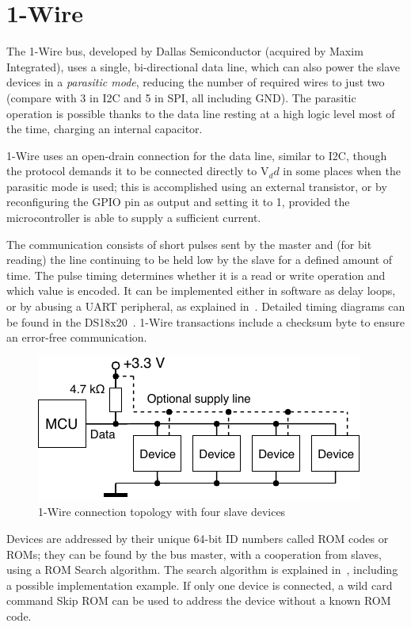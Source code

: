 \section{1-Wire} \label{sec:theory-1wire}

The 1-Wire bus, developed by Dallas Semiconductor (acquired by Maxim Integrated), uses a single, bi-directional data line, which can also power the slave devices in a \textit{parasitic mode}, reducing the number of required wires to just two (compare with 3 in \gls{I2C} and 5 in \gls{SPI}, all including \gls{GND}). The parasitic operation is possible thanks to the data line resting at a high logic level most of the time, charging an internal capacitor.

1-Wire uses an open-drain connection for the data line, similar to \gls{I2C}, though the protocol demands it to be connected directly to V$_dd$ in some places when the parasitic mode is used; this is accomplished using an external transistor, or by reconfiguring the GPIO pin as output and setting it to 1, provided the microcontroller is able to supply a sufficient current.

The communication consists of short pulses sent by the master and (for bit reading) the line continuing to be held low by the slave for a defined amount of time. The pulse timing determines whether it is a read or write operation and which value is encoded. It can be implemented either in software as delay loops, or by abusing a \gls{UART} peripheral, as explained in~\cite{ow-uart}. Detailed timing diagrams can be found in the DS18x20~\cite{ow-datasheet}. 1-Wire transactions include a checksum byte to ensure an error-free communication.

\begin{figure}[h]
	\centering
	\includegraphics[scale=1] {img/1w-connection.pdf}
	\caption{\label{fig:1w-topology}1-Wire connection topology with four slave devices}
\end{figure}

Devices are addressed by their unique 64-bit ID numbers called ROM codes or ROMs; they can be found by the bus master, with a cooperation from slaves, using a ROM Search algorithm. The search algorithm is explained in~\cite{ow-appnote}, including a possible implementation example. If only one device is connected, a wild card command Skip ROM can be used to address the device without a known ROM code.

